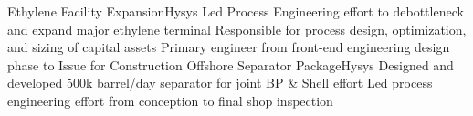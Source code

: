 %
%
%
%
\justifiedsubsection%
%
{Ethylene Facility Expansion}{Hysys}
%
\workitemsThree%
%
{Led Process Engineering effort to debottleneck and expand major ethylene terminal}
{Responsible for process design, optimization, and sizing of capital assets}
{Primary engineer from front-end engineering design phase to Issue for Construction}
%
%
%
%
\justifiedsubsection%
%
{Offshore Separator Package}{Hysys}
%
\workitemsTwo%
%
{Designed and developed 500k barrel/day separator for joint BP \& Shell effort}
{Led process engineering effort from conception to final shop inspection}
%
%
%
%